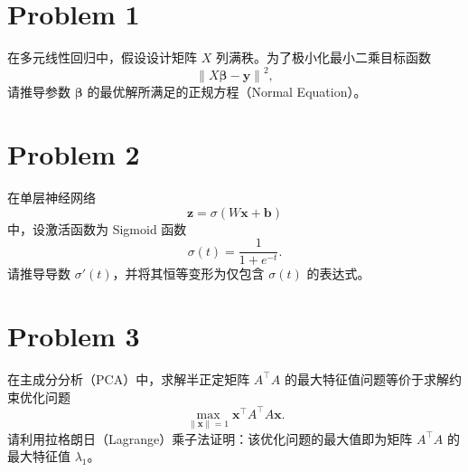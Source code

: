 \section*{Problem 1}

在多元线性回归中，假设设计矩阵 $X$ 列满秩。为了极小化最小二乘目标函数
\[
    \left\|X\bm{\beta} - \bm{y}\right\|^2,
\]
请推导参数 $\bm{\beta}$ 的最优解所满足的正规方程（Normal Equation）。

\section*{Problem 2}

在单层神经网络
\[
    \bm{z} = \sigma\left(W\bm{x} + \bm{b}\right)
\]
中，设激活函数为 Sigmoid 函数
\[
    \sigma(t) = \frac{1}{1 + e^{-t}}.
\]
请推导导数 $\sigma'(t)$，并将其恒等变形为仅包含 $\sigma(t)$ 的表达式。

\section*{Problem 3}

在主成分分析（PCA）中，求解半正定矩阵 $A^\top A$ 的最大特征值问题等价于求解约束优化问题
\[
    \max_{\|\bm{x}\| = 1}\bm{x}^\top A^\top A\bm{x}.
\]
请利用拉格朗日（Lagrange）乘子法证明：该优化问题的最大值即为矩阵 $A^\top A$ 的最大特征值 $\lambda_1$。

